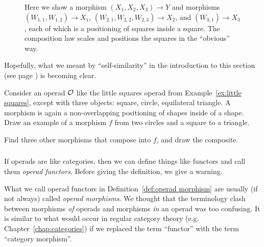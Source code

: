 \documentclass[CT4S-EN-RU]{subfiles}
\begin{document}
\begin{exampleENG}
\begin{figure}[H]
\begin{center}
\end{center}
\caption{Here we show a morphism $(X_1,X_2,X_3)\to Y$ and morphisms $(W_{1,1},W_{1,2})\to X_1$, $(W_{2,1},W_{2,2},W_{2,3})\to X_2$, and $(W_{3,1})\to X_3$, each of which is a positioning of squares inside a square. The composition law scales and positions the squares in the “obvious” way.}
\label{fig:composition law for squares}
\end{figure}

Hopefully, what we meant by “self-similarity” in the introduction to this section (see page \pageref{sec:operad}) is becoming clear.
\end{exampleENG}

\begin{exampleRUS}\label{ex:little squares}
\end{exampleRUS}

\begin{exerciseENG}\label{exc:little shapes}
Consider an operad $\mathcal{O}$ like the little squares operad from Example~\ref{ex:little squares}, except with three objects: square, circle, equilateral triangle. A morphism is again a non-overlapping positioning of shapes inside of a shape. 
\sexc Draw an example of a morphism $f$ from two circles and a square to a triangle.
\item Find three other morphisms that compose into $f$, and draw the composite.
\endsexc
\end{exerciseENG}

\begin{exerciseRUS}\label{exc:little shapes}
\end{exerciseRUS}


\subsubsection{}

\begin{blockENG}
If operads are like categories, then we can define things like functors and call them {\em operad functors}. Before giving the definition, we give a warning.
\end{blockENG}

\begin{blockRUS}
\end{blockRUS}

\begin{warningENG}
What we call operad functors in Definition~\ref{def:operad morphism} are usually (if not always) called {\em operad morphisms}. We thought that the terminology clash between morphisms {\em of} operads and morphisms {\em in} an operad was too confusing. It is similar to what would occur in regular category theory (e.g. Chapter~\ref{chap:categories}) if we replaced the term “functor” with the term “category morphism”. 
\end{warningENG}
\end{document}
